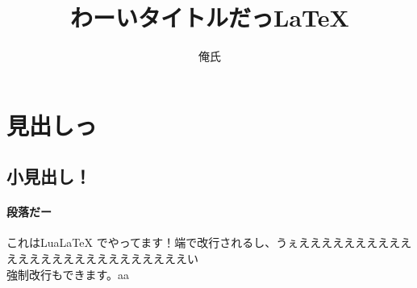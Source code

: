 \documentclass{ltjsarticle}
\begin{document}
\title{わーいタイトルだっ\textrm{\LaTeX}}
\author{俺氏}
\maketitle
\section{見出しっ}
\subsection{小見出し！}
\paragraph{段落だー}
これはLua\textrm{\LaTeX} でやってます！端で改行されるし、うぇええええええええええええええええええええええええええい\\
強制改行もできます。aa
\end{document}
